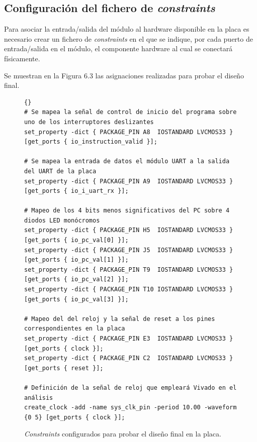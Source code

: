 \subsection{Configuración del fichero de \textit{constraints}}

Para asociar la entrada/salida del módulo al hardware disponible en la placa es necesario crear un fichero de \textit{constraints} en el que se indique, por cada puerto de entrada/salida en el módulo, el componente hardware al cual se conectará físicamente.

Se muestran en la Figura 6.3 las asignaciones realizadas para probar el diseño final.

\vspace{+0.4cm}
\begin{figure}[h!]
\begin{lstlisting}[style=XDCStyle,columns=fullflexible]{}
# Se mapea la señal de control de inicio del programa sobre uno de los interruptores deslizantes
set_property -dict { PACKAGE_PIN A8  IOSTANDARD LVCMOS33 } [get_ports { io_instruction_valid }];

# Se mapea la entrada de datos el módulo UART a la salida del UART de la placa
set_property -dict { PACKAGE_PIN A9  IOSTANDARD LVCMOS33 } [get_ports { io_i_uart_rx }];

# Mapeo de los 4 bits menos significativos del PC sobre 4 diodos LED monócromos
set_property -dict { PACKAGE_PIN H5  IOSTANDARD LVCMOS33 } [get_ports { io_pc_val[0] }];
set_property -dict { PACKAGE_PIN J5  IOSTANDARD LVCMOS33 } [get_ports { io_pc_val[1] }];
set_property -dict { PACKAGE_PIN T9  IOSTANDARD LVCMOS33 } [get_ports { io_pc_val[2] }];
set_property -dict { PACKAGE_PIN T10 IOSTANDARD LVCMOS33 } [get_ports { io_pc_val[3] }];

# Mapeo del del reloj y la señal de reset a los pines correspondientes en la placa
set_property -dict { PACKAGE_PIN E3  IOSTANDARD LVCMOS33 } [get_ports { clock }];
set_property -dict { PACKAGE_PIN C2  IOSTANDARD LVCMOS33 } [get_ports { reset }];

# Definición de la señal de reloj que empleará Vivado en el análisis
create_clock -add -name sys_clk_pin -period 10.00 -waveform {0 5} [get_ports { clock }];
\end{lstlisting}
\vspace{-0.1cm}
\caption{\textit{Constraints} configurados para probar el diseño final en la placa.}
\end{figure}

